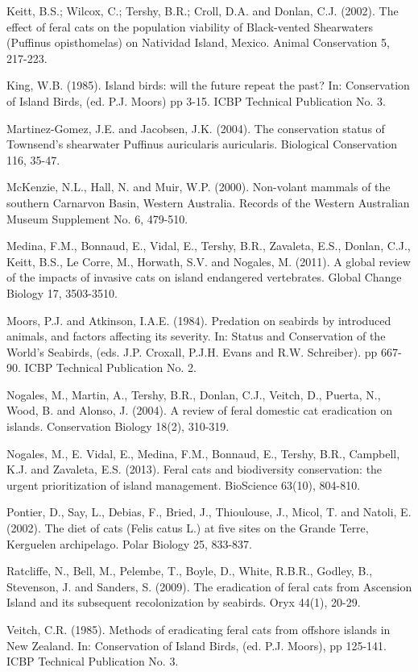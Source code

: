 \documentclass[version=last,
    paper=a4,                               %
    10pt,                                   %
    dvipsnames,
    oneside,                              %
    headings=openany,                       %
    open=any,
    BCOR=7mm,                               %
    DIV=15,     %
]{scrbook}
\begin{document}
Keitt, B.S.; Wilcox, C.; Tershy, B.R.; Croll, D.A. and Donlan, C.J.
(2002). The effect of feral cats on the population viability of
Black-vented Shearwaters (Puffinus opisthomelas) on Natividad Island,
Mexico. Animal Conservation 5, 217-223.

King, W.B. (1985). Island birds: will the future repeat the past? In:
Conservation of Island Birds, (ed. P.J. Moors) pp 3-15. ICBP Technical
Publication No. 3.

Martinez-Gomez, J.E. and Jacobsen, J.K. (2004). The conservation status
of Townsend's shearwater Puffinus auricularis auricularis. Biological
Conservation 116, 35-47.

McKenzie, N.L., Hall, N. and Muir, W.P. (2000). Non-volant mammals of
the southern Carnarvon Basin, Western Australia. Records of the Western
Australian Museum Supplement No. 6, 479-510.

Medina, F.M., Bonnaud, E., Vidal, E., Tershy, B.R., Zavaleta, E.S.,
Donlan, C.J., Keitt, B.S., Le Corre, M., Horwath, S.V. and Nogales, M.
(2011). A global review of the impacts of invasive cats on island
endangered vertebrates. Global Change Biology 17, 3503-3510.

Moors, P.J. and Atkinson, I.A.E. (1984). Predation on seabirds by
introduced animals, and factors affecting its severity. In: Status and
Conservation of the World's Seabirds, (eds. J.P. Croxall, P.J.H. Evans
and R.W. Schreiber). pp 667-90. ICBP Technical Publication No. 2.

Nogales, M., Martin, A., Tershy, B.R., Donlan, C.J., Veitch, D., Puerta,
N., Wood, B. and Alonso, J. (2004). A review of feral domestic cat
eradication on islands. Conservation Biology 18(2), 310-319.

Nogales, M., E. Vidal, E., Medina, F.M., Bonnaud, E., Tershy, B.R.,
Campbell, K.J. and Zavaleta, E.S. (2013). Feral cats and biodiversity
conservation: the urgent prioritization of island management. BioScience
63(10), 804-810.

Pontier, D., Say, L., Debias, F., Bried, J., Thioulouse, J., Micol, T.
and Natoli, E. (2002). The diet of cats (Felis catus L.) at five sites
on the Grande Terre, Kerguelen archipelago. Polar Biology 25, 833-837.

Ratcliffe, N., Bell, M., Pelembe, T., Boyle, D., White, R.B.R., Godley,
B., Stevenson, J. and Sanders, S. (2009). The eradication of feral cats
from Ascension Island and its subsequent recolonization by seabirds.
Oryx 44(1), 20-29.

Veitch, C.R. (1985). Methods of eradicating feral cats from offshore
islands in New Zealand. In: Conservation of Island Birds, (ed. P.J.
Moors), pp 125-141. ICBP Technical Publication No. 3.
\end{document}

